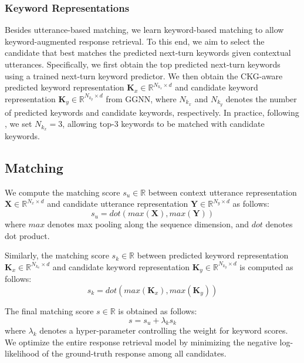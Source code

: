 \documentclass[letterpaper]{article} %
\begin{document}
\subsubsection{Keyword Representations}
Besides utterance-based matching, we learn keyword-based matching to allow keyword-augmented response retrieval. To this end, we aim to select the candidate that best matches the predicted next-turn keywords given contextual utterances. Specifically, we first obtain the top predicted next-turn keywords using a trained next-turn keyword predictor. We then obtain the CKG-aware predicted keyword representation $\mathbf{K}_x \in \mathbb{R}^{N_{k_x} \times d}$ and candidate keyword representation $\mathbf{K}_y \in \mathbb{R}^{N_{k_y} \times d}$ from GGNN, where $N_{k_x}$ and $N_{k_y}$ denotes the number of predicted keywords and candidate keywords, respectively. In practice, following \cite{tang2019target}, we set $N_{k_x} = 3$, allowing top-3 keywords to be matched with candidate keywords.

\subsection{Matching}
We compute the matching score $s_u \in \mathbb{R}$ between context utterance representation $\mathbf{X} \in \mathbb{R}^{N_x \times d}$ and candidate utterance representation $\mathbf{Y} \in \mathbb{R}^{N_y \times d}$ as follows:
\begin{equation}
\label{eqn: utterance matching}
    s_u = \textit{dot}(\textit{max}(\mathbf{X}), \textit{max}(\mathbf{Y}))
\end{equation}
where $\textit{max}$ denotes max pooling along the sequence dimension, and $\textit{dot}$ denotes dot product.

Similarly, the matching score $s_k \in \mathbb{R}$ between predicted keyword representation $\mathbf{K}_x \in \mathbb{R}^{N_{k_x} \times d}$ and candidate keyword representation $\mathbf{K}_y \in \mathbb{R}^{N_{k_y} \times d}$ is computed as follows:
\begin{equation}
\label{eqn: keyword matching}
    s_k = \textit{dot}(\textit{max}(\mathbf{K}_x), \textit{max}(\mathbf{K}_y))
\end{equation}

The final matching score $s \in \mathbb{R}$ is obtained as follows:
\begin{equation}
\label{eqn: final matching}
    s = s_u + \lambda_k s_k
\end{equation}
where $\lambda_k$ denotes a hyper-parameter controlling the weight for keyword scores. We optimize the entire response retrieval model by minimizing the negative log-likelihood of the ground-truth response among all candidates.
\end{document}

